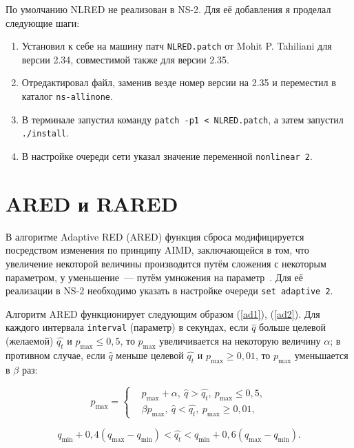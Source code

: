 По умолчанию NLRED не реализован в NS-2. Для её добавления я проделал следующие шаги:

\begin{enumerate}
\item Установил к себе на машину патч \verb|NLRED.patch| от Mohit
  P. Tahiliani для версии 2.34, совместимой также для версии 2.35.
\item Отредактировал файл, заменив везде номер версии на 2.35 и
  переместил в каталог \verb|ns-allinone|.
\item В терминале запустил команду \verb|patch -p1 < NLRED.patch|, а
  затем запустил \verb|./install|.
\item В настройке очереди сети указал значение переменной \verb|nonlinear 2|.
\end{enumerate}
 
\section{ARED и RARED}

В алгоритме Adaptive RED (ARED) функция сброса модифицируется
посредством изменения по принципу AIMD, заключающейся в том, что
увеличение некоторой величины производится путём сложения с некоторым
параметром, у уменьшение~--- путём умножения на
параметр~\cite{RARED}. Для её реализации в NS-2 необходимо указать в
настройке очереди \verb|set adaptive 2|.

Алгоритм ARED функционирует следующим образом (\ref{ad1}),
(\ref{ad2}). Для каждого интервала \verb|interval| (параметр) в
секундах, если $\hat{q}$ больше целевой (желаемой) $\hat{q_t}$ и
$p_{\max} \leqslant 0,5$, то $p_{\max}$ увеличивается на некоторую
величину $\alpha$; в противном случае, если $\hat{q}$ меньше целевой
$\hat{q_t}$ и $p_{\max}\geqslant 0,01$, то $p_{\max}$ уменьшается в
$\beta$ раз:

\begin{equation}
\label{ad1}
p_{\max} = \left\{
  \begin{aligned}
    & p_{\max}+\alpha, \ \hat{q}>\hat{q_{t}}, \ p_{\max} \leqslant 0,5, \\
    & \beta p_{\max}, \ \hat{q}<\hat{q_{t}}, \ p_{\max} \geqslant 0,01, 
  \end{aligned}
\right.
\end{equation}

\begin{equation}
\label{ad2}
q_{\min}+0,4(q_{\max}-q_{\min}) < \hat{q_t} < q_{\min}+0,6\left(q_{\max}-q_{\min}\right).
\end{equation}

